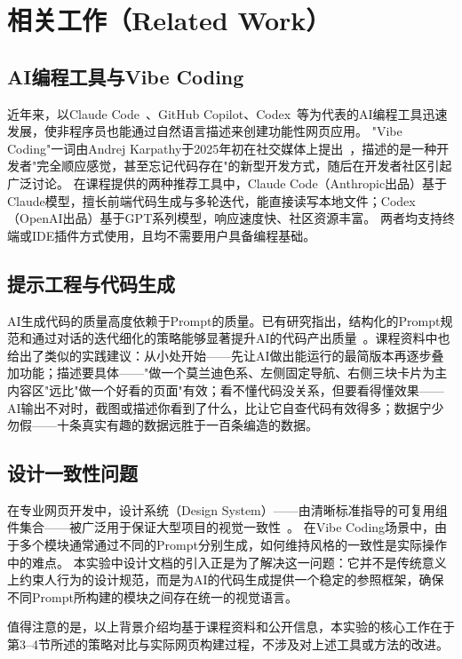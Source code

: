 \section{相关工作（Related Work）}

\subsection{AI编程工具与Vibe Coding}

近年来，以Claude Code~\cite{anthropic2025claude}、GitHub Copilot、Codex~\cite{openai2025codex}等为代表的AI编程工具迅速发展，使非程序员也能通过自然语言描述来创建功能性网页应用。
"Vibe Coding"一词由Andrej Karpathy于2025年初在社交媒体上提出~\cite{karpathy2025vibe}，描述的是一种开发者"完全顺应感觉，甚至忘记代码存在"的新型开发方式，随后在开发者社区引起广泛讨论。
在课程提供的两种推荐工具中，Claude Code（Anthropic出品）基于Claude模型，擅长前端代码生成与多轮迭代，能直接读写本地文件；Codex（OpenAI出品）基于GPT系列模型，响应速度快、社区资源丰富。
两者均支持终端或IDE插件方式使用，且均不需要用户具备编程基础。

\subsection{提示工程与代码生成}

AI生成代码的质量高度依赖于Prompt的质量。已有研究指出，结构化的Prompt规范和通过对话的迭代细化的策略能够显著提升AI的代码产出质量~\cite{vaithilingam2022expectation}。课程资料中也给出了类似的实践建议：从小处开始——先让AI做出能运行的最简版本再逐步叠加功能；描述要具体——"做一个莫兰迪色系、左侧固定导航、右侧三块卡片为主内容区"远比"做一个好看的页面"有效；看不懂代码没关系，但要看得懂效果——AI输出不对时，截图或描述你看到了什么，比让它自查代码有效得多；数据宁少勿假——十条真实有趣的数据远胜于一百条编造的数据。

\subsection{设计一致性问题}

在专业网页开发中，设计系统（Design System）——由清晰标准指导的可复用组件集合——被广泛用于保证大型项目的视觉一致性~\cite{kholmatova2017design}。
在Vibe Coding场景中，由于多个模块通常通过不同的Prompt分别生成，如何维持风格的一致性是实际操作中的难点。
本实验中设计文档的引入正是为了解决这一问题：它并不是传统意义上约束人行为的设计规范，而是为AI的代码生成提供一个稳定的参照框架，确保不同Prompt所构建的模块之间存在统一的视觉语言。

值得注意的是，以上背景介绍均基于课程资料和公开信息，本实验的核心工作在于第3--4节所述的策略对比与实际网页构建过程，不涉及对上述工具或方法的改进。
